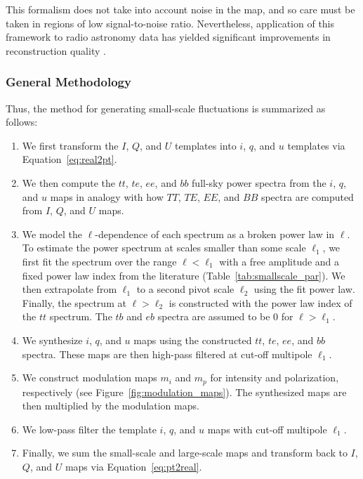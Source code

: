 \documentclass[twocolumn]{aastex631}
\begin{document}
This formalism does not take into account noise in the map, and so care must be taken in regions of low signal-to-noise ratio. Nevertheless, application of this framework to radio astronomy data has yielded significant improvements in reconstruction quality \citep{Arras:2021}.

\subsubsection{General Methodology}\label{subsec:methodology}
Thus, the method for generating small-scale fluctuations is summarized as follows: 
\begin{enumerate}
    \item We first transform the $I$, $Q$, and $U$ templates into $i$, $q$, and $u$ templates via Equation~\eqref{eq:real2pt}.
    \item We then compute the $tt$, $te$, $ee$, and $bb$ full-sky power spectra from the $i$, $q$, and $u$ maps in analogy with how $TT$, $TE$, $EE$, and $BB$ spectra are computed from $I$, $Q$, and $U$ maps.
    \item We model the $\ell$-dependence of each spectrum as a broken power law in $\ell$. To estimate the power spectrum at scales smaller than some scale $\ell_1$, we first fit the spectrum over the range $\ell < \ell_1$ with a free amplitude and a fixed power law index from the literature (Table~\ref{tab:smallscale_par}). We then extrapolate from $\ell_1$ to a second pivot scale $\ell_2$ using the fit power law. Finally, the spectrum at $\ell > \ell_2$ is constructed with the power law index of the $tt$ spectrum. The $tb$ and $eb$ spectra are assumed to be 0 for $\ell > \ell_1$.
    \item  We synthesize $i$, $q$, and $u$ maps using the constructed $tt$, $te$, $ee$, and $bb$ spectra. These maps are then high-pass filtered at cut-off multipole $\ell_1$.
    \item We construct modulation maps $m_i$ and $m_p$ for intensity and polarization, respectively (see Figure~\ref{fig:modulation_maps}). The synthesized maps are then multiplied by the modulation maps.
    \item We low-pass filter the template $i$, $q$, and $u$ maps with cut-off multipole $\ell_1$.
    \item Finally, we sum the small-scale and large-scale maps and transform back to $I$, $Q$, and $U$ maps via Equation~\eqref{eq:pt2real}.
\end{enumerate}
\end{document}
